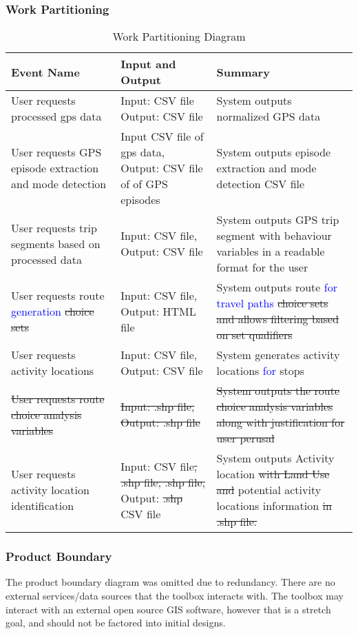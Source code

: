 \documentclass[12pt, titlepage]{article}
\begin{document}
\subsubsection{Work Partitioning}
\begin{table}[H]
    \centering
    \begin{tabular}{|p{4cm}|p{4cm}|p{6cm}|}
         \hline
         Event Name & Input and Output & Summary\\
         \hline
         User requests processed gps data & Input: CSV file Output: CSV file & System outputs normalized GPS data\\
         \hline
         User requests GPS episode extraction and mode detection & Input CSV file of gps data, Output: CSV file of of GPS episodes & System outputs episode extraction and mode detection CSV file\\
         \hline
         User requests trip segments based on processed data & Input: CSV file, Output: CSV file & System outputs GPS trip segment with behaviour variables in a readable format for the user\\
         \hline
         User requests route \textcolor{blue}{generation} \sout{choice sets} & Input: CSV file, Output: HTML file & System outputs route \textcolor{blue}{for travel paths} \sout{choice sets and allows filtering based on set qualifiers}\\
         \hline
         User requests activity locations  & Input: CSV file, Output: CSV file & System generates activity locations \textcolor{blue}{for} stops \\
         \hline
         \sout{User requests route choice analysis variables}  & \sout{Input: .shp file, Output: .shp file} & \sout{System outputs the route choice analysis variables along with justification for user perusal} \\
         \hline
          User requests activity location identification  & Input: CSV file\sout{, .shp file, .shp file,} Output: \sout{.shp} CSV file& System outputs Activity location \sout{with Land Use and} potential activity locations information \sout{ in .shp file.} \\
         \hline
    \end{tabular}
    \caption{Work Partitioning Diagram\cite{GISBASED}}
    \label{tab:work_partitioning_diagram}
\end{table}

\subsubsection{Product Boundary}
The product boundary diagram was omitted due to redundancy. There are no external services/data sources that the toolbox interacts with. The toolbox may interact with an external open source GIS software, however that is a stretch goal, and should not be factored into initial designs. 
\end{document}
